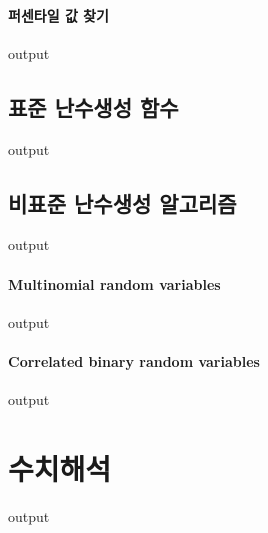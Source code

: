 \documentclass{report}
\begin{document}
\paragraph{퍼센타일 값 찾기}
\begin{Schunk}
\begin{Soutput}
output
\end{Soutput}
\end{Schunk}

\subsection{표준 난수생성 함수}
\begin{Schunk}
\begin{Soutput}
output
\end{Soutput}
\end{Schunk}

\subsection{비표준 난수생성 알고리즘}
\begin{Schunk}
\begin{Soutput}
output
\end{Soutput}
\end{Schunk}
\paragraph{Multinomial random variables}
\begin{Schunk}
\begin{Soutput}
output
\end{Soutput}
\end{Schunk}

\paragraph{Correlated binary random variables}
\begin{Schunk}
\begin{Soutput}
output
\end{Soutput}
\end{Schunk}

\section{수치해석}
\begin{Schunk}
\begin{Soutput}
output
\end{Soutput}
\end{Schunk}
\end{document}
